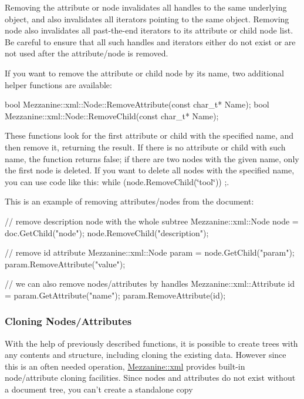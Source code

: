 Removing the attribute or node invalidates all handles to the same underlying object, and also invalidates all iterators pointing to the same object. Removing node also invalidates all past-\/the-\/end iterators to its attribute or child node list. Be careful to ensure that all such handles and iterators either do not exist or are not used after the attribute/node is removed. \par
 \par
 If you want to remove the attribute or child node by its name, two additional helper functions are available: 
\begin{DoxyCode}
 bool Mezzanine::xml::Node::RemoveAttribute(const char_t* Name);
 bool Mezzanine::xml::Node::RemoveChild(const char_t* Name);
\end{DoxyCode}
 These functions look for the first attribute or child with the specified name, and then remove it, returning the result. If there is no attribute or child with such name, the function returns false; if there are two nodes with the given name, only the first node is deleted. If you want to delete all nodes with the specified name, you can use code like this: while (node.RemoveChild(\char`\"{}tool\char`\"{})) ;. \par
 \par
 This is an example of removing attributes/nodes from the document: 
\begin{DoxyCode}
 // remove description node with the whole subtree
 Mezzanine::xml::Node node = doc.GetChild("node");
 node.RemoveChild("description");

 // remove id attribute
 Mezzanine::xml::Node param = node.GetChild("param");
 param.RemoveAttribute("value");

 // we can also remove nodes/attributes by handles
 Mezzanine::xml::Attribute id = param.GetAttribute("name");
 param.RemoveAttribute(id);
\end{DoxyCode}
 \hypertarget{XMLManual_XMLModifyingCloning}{}\subsubsection{Cloning Nodes/Attributes}\label{XMLManual_XMLModifyingCloning}
With the help of previously described functions, it is possible to create trees with any contents and structure, including cloning the existing data. However since this is an often needed operation, \hyperlink{namespaceMezzanine_1_1xml}{Mezzanine::xml} provides built-\/in node/attribute cloning facilities. Since nodes and attributes do not exist without a document tree, you can't create a standalone copy
